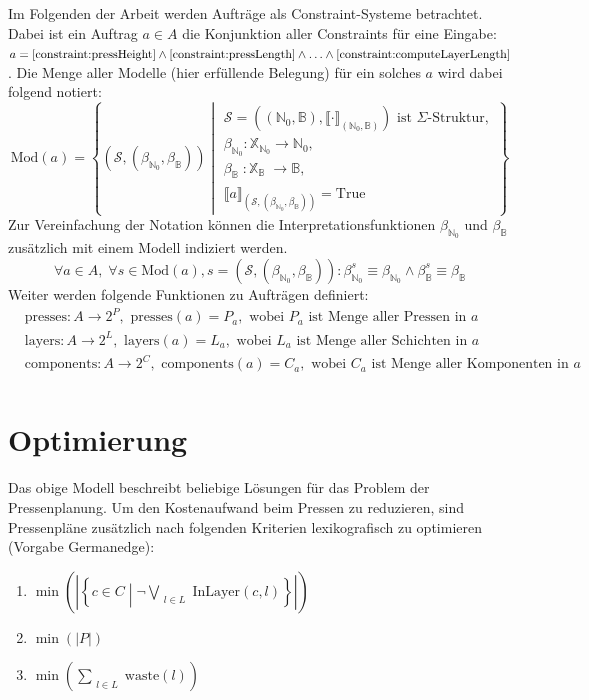 Im Folgenden der Arbeit werden Aufträge als Constraint-Systeme betrachtet.
Dabei ist ein Auftrag $a \in A$ die Konjunktion aller Constraints für eine Eingabe:
$a = \ref{constraint:pressHeight} \land \ref{constraint:pressLength} \land \ldots \land \ref{constraint:computeLayerLength}$.
Die Menge aller Modelle (hier erfüllende Belegung) für ein solches $a$ wird dabei folgend notiert:
\[
    \text{Mod}(a) = \left\{
        (\mathcal{S}, (\beta_{\mathbb{N}_0}, \beta_{\mathbb{B}})) \middle|
            \begin{array}{l}
                \mathcal{S} = ((\mathbb{N}_0, \mathbb{B}), \llbracket \cdot \rrbracket_{(\mathbb{N}_0, \mathbb{B})}) \text{ ist } \Sigma\text{-Struktur}, \\
                \beta_{\mathbb{N}_0}: \mathbb{X}_{\mathbb{N}_0} \rightarrow \mathbb{N}_0, \\
                \beta_{\mathbb{B}_{\phantom{0}}}: \mathbb{X}_{\mathbb{B}_{\phantom{0}}} \rightarrow \mathbb{B}, \\
                \llbracket a \rrbracket_{(\mathcal{S}, (\beta_{\mathbb{N}_0}, \beta_{\mathbb{B}}))} = \text{True}
            \end{array}
    \right\}
\]
Zur Vereinfachung der Notation können die Interpretationsfunktionen $\beta_{\mathbb{N}_0}$ und $\beta_{\mathbb{B}}$ zusätzlich mit einem Modell indiziert werden.
\[
    \forall a \in A, \; \forall s \in \text{Mod}(a), s = (\mathcal{S}, (\beta_{\mathbb{N}_0}, \beta_{\mathbb{B}})): \beta_{\mathbb{N}_0}^s \equiv \beta_{\mathbb{N}_0} \land \beta_{\mathbb{B}}^s \equiv \beta_{\mathbb{B}}
\]
Weiter werden folgende Funktionen zu Aufträgen definiert:
\begin{align*}
    & \text{presses}: A \rightarrow 2^P, \text{ presses}(a) = P_a, \text{ wobei } P_a \text{ ist Menge aller Pressen in } a \\
    & \text{layers}: A \rightarrow 2^L, \text{ layers}(a) = L_a, \text{ wobei } L_a \text{ ist Menge aller Schichten in } a \\
    & \text{components}: A \rightarrow 2^C, \text{ components}(a) = C_a, \text{ wobei } C_a \text{ ist Menge aller Komponenten in } a \\
\end{align*}

\section{Optimierung}
\label{sec:optimierung}
Das obige Modell beschreibt beliebige Lösungen für das Problem der Pressenplanung.
Um den Kostenaufwand beim Pressen zu reduzieren, sind Pressenpläne zusätzlich nach folgenden Kriterien lexikografisch zu optimieren (Vorgabe Germanedge):
\begin{enumerate}
    \item $ \min \left( \left\lvert \left\{ c \in C \middle| \neg\bigvee\limits_{\substack{l \in L}} \text{InLayer}(c,l) \right\} \right\rvert \right) $
    \item $ \min (\lvert P \rvert) $
    \item $ \min \left(\sum\limits_{\substack{l \in L}} \text{waste}(l) \right) $
\end{enumerate}

